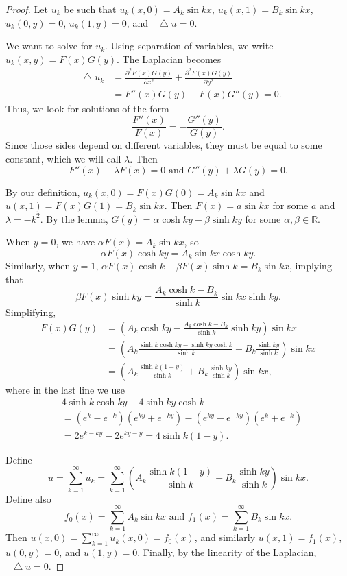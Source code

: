 \documentclass[oneside]{article}
\newcommand*\Laplace{\mathop{}\!\mathbin\bigtriangleup}
\newcommand\bbR{\mathbb{R}}
\begin{document}
\begin{proof}

Let $u_k$ be such that $u_k(x, 0) = A_k\sin kx$, $u_k(x, 1) = B_k\sin kx$,
$u_k(0, y) = 0$, $u_k(1, y) = 0$, and $\Laplace u = 0$.

We want to solve for $u_k$. Using separation of variables, we write
$u_k(x, y) = F(x)G(y)$. The Laplacian becomes \begin{align*}
  \Laplace u_k
  &= \frac{\partial^2F(x)G(y)}{\partial x^2}
     + \frac{\partial^2F(x)G(y)}{\partial y^2} \\
  &= F''(x)G(y) + F(x)G''(y) = 0 \text{.}
\end{align*} Thus, we look for solutions of the form\[
  \frac{F''(x)}{F(x)} = - \frac{G''(y)}{G(y)} \text{.}
\] Since those sides depend on different variables, they must be equal to some
constant, which we will call $\lambda$. Then \[
  F''(x) - \lambda F(x) = 0 \text{ and } G''(y) + \lambda G(y) = 0 \text{.}
\]

By our definition, $u_k(x, 0) = F(x)G(0) = A_k\sin kx$ and
$u(x, 1) = F(x)G(1) = B_k\sin kx$. Then $F(x) = a\sin kx$ for some $a$ and
$\lambda = -k^2$. By the lemma, $G(y) = \alpha\cosh ky - \beta\sinh ky$ for
some $\alpha, \beta \in \bbR$.

When $y = 0$, we have $\alpha F(x) = A_k\sin kx$, so\[
  \alpha F(x)\cosh ky = A_k\sin kx \cosh ky \text{.}
\] Similarly, when $y=1$,
$\alpha F(x) \cosh k - \beta F(x) \sinh k = B_k \sin kx$, implying that\[
  \beta F(x) \sinh ky = \frac{A_k \cosh k - B_k}{\sinh k}\sin kx\sinh ky \text{.}
\] Simplifying,\begin{align*}
  F(x)G(y) &= \left(A_k \cosh ky
                    - \frac{A_k \cosh k - B_k}{\sinh k}\sinh ky\right)\sin kx \\
  &= \left(A_k\frac{\sinh k \cosh ky - \sinh ky\cosh k}{\sinh k} + B_k\frac{\sinh ky}{\sinh k}\right)\sin kx \\
  &= \left(A_k\frac{\sinh k(1-y)}{\sinh k} + B_k\frac{\sinh ky}{\sinh k}\right)
    \sin kx \text{,}
\end{align*} where in the last line we use \begin{align*}
  &4\sinh k \cosh ky - 4\sinh ky \cosh k \\
  &= \left(e^k-e^{-k}\right)\left(e^{ky}+e^{-ky}\right)
    - \left(e^{ky}-e^{-ky}\right)\left(e^k+e^{-k}\right) \\
  &= 2 e^{k - ky} - 2e^{ky - y} = 4 \sinh k(1-y) \text{.}
\end{align*}

Define \[
  u = \sum_{k=1}^\infty u_k
    = \sum_{k=1}^\infty \left(A_k\frac{\sinh k(1-y)}{\sinh k}
           + B_k\frac{\sinh ky}{\sinh k}\right)\sin kx \text{.}
\] Define also\[
  f_0(x) = \sum_{k=1}^\infty A_k\sin kx\text{ and }
  f_1(x) = \sum_{k=1}^\infty B_k\sin kx\text{.}
\] Then $u(x, 0) = \sum_{k=1}^\infty u_k (x, 0) = f_0(x)$, and similarly
$u(x, 1) = f_1(x)$, $u(0, y) = 0$, and $u(1, y) = 0$. Finally, by the linearity
of the Laplacian, $\Laplace u = 0$.\end{proof}
\end{document}

